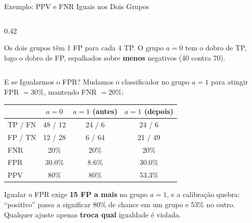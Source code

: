 \documentclass[aspectratio=169,xcolor=dvipsnames]{beamer}
\begin{document}
\begin{frame}{Exemplo: PPV e FNR Iguais nos Dois Grupos}
\begin{columns}[T]
\begin{column}{0.42\textwidth}
        \vspace{0.5em}
        \raggedright\footnotesize
        Os dois grupos têm 1 FP para cada 4 TP. O grupo $a{=}0$ tem o dobro de TP, logo o dobro de FP, espalhados sobre \textbf{menos} negativos (40 contra 70).
      \end{column}
    \end{columns}
  \end{frame}

  \begin{frame}{E se Igualarmos o FPR?}
    Mudamos o classificador no grupo $a{=}1$ para atingir FPR $= 30\%$, mantendo FNR $= 20\%$:

    \vspace{0.6em}
    \centering
    \renewcommand{\arraystretch}{1.3}
    \begin{tabular}{lccc}
      \toprule
       & $a{=}0$ & $a{=}1$ (antes) & $a{=}1$ (depois) \\
      \midrule
      TP / FN & 48 / 12 & 24 / 6 & 24 / 6 \\
      FP / TN & 12 / 28 & 6 / 64 & 21 / 49 \\
      \midrule
      FNR & 20\% & 20\% & 20\% \\
      FPR & 30.0\% & \textcolor{FairRed}{8.6\%} & \textcolor{FairGreen}{30.0\%} \\
      PPV & 80\% & 80\% & \textcolor{FairRed}{53.3\%} \\
      \bottomrule
    \end{tabular}

    \vspace{0.6em}
    \raggedright
    Igualar o FPR exige \textbf{15 FP a mais} no grupo $a{=}1$, e a calibração quebra: \enquote{positivo} passa a significar 80\% de chance em um grupo e 53\% no outro. Qualquer ajuste apenas \textbf{troca qual} igualdade é violada.
  \end{frame}
\end{document}
